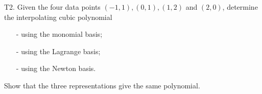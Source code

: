 \documentclass[12pt]{report}
\begin{document}
\newpage



\begin{problem}
    T2. Given the four data points $(-1, 1), (0, 1), (1, 2)$ and $(2, 0)$, determine the interpolating cubic polynomial
    \begin{enumerate}
        \item[-] using the monomial basis;
        \item[-] using the Lagrange basis;
        \item[-] using the Newton basis.
    \end{enumerate}
    Show that the three representations give the same polynomial.
\end{problem}
\end{document}
